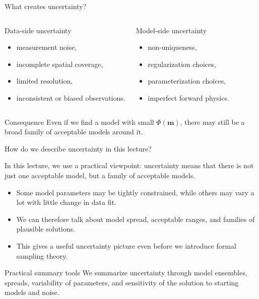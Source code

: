 \documentclass[aspectratio=169]{beamer}
\renewcommand{\vec}[1]{\mathbf{#1}}
\newcommand{\mm}{ {\vec{m}} }
\begin{document}
\begin{frame}{What creates uncertainty?}
\small

\begin{columns}[T]
\begin{block}{Data-side uncertainty}
\begin{itemize}
    \item[--] measurement noise,
    \item[--] incomplete spatial coverage,
    \item[--] limited resolution,
    \item[--] inconsistent or biased observations.
\end{itemize}
\end{block}

\begin{block}{Model-side uncertainty}
\begin{itemize}
    \item[--] non-uniqueness,
    \item[--] regularization choices,
    \item[--] parameterization choices,
    \item[--] imperfect forward physics.
\end{itemize}
\end{block}
\end{columns}

\begin{alertblock}{Consequence}
Even if we find a model with small $\Phi(\mm)$, there may still be a broad family of acceptable models around it.
\end{alertblock}
\end{frame}

\begin{frame}{How do we describe uncertainty in this lecture?}
\small

In this lecture, we use a practical viewpoint: uncertainty means that there is not just one acceptable model, but a \alert{family of acceptable models}.

\begin{itemize}
    \item[--] Some model parameters may be tightly constrained, while others may vary a lot with little change in data fit.
    \item[--] We can therefore talk about model spread, acceptable ranges, and families of plausible solutions.
    \item[--] This gives a useful uncertainty picture even before we introduce formal sampling theory.
\end{itemize}

\begin{block}{Practical summary tools}
We summarize uncertainty through model ensembles, spreads, variability of parameters, and sensitivity of the solution to starting models and noise.
\end{block}
\end{frame}
\end{document}

